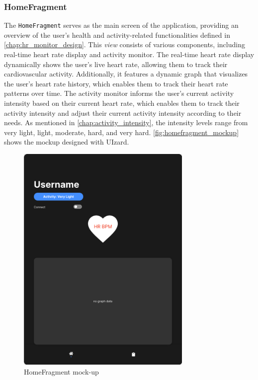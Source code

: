 \subsubsection{HomeFragment}
\label{chap:home_design}
The \texttt{HomeFragment} serves as the main screen of the application, providing an overview of the user's health and activity-related functionalities defined in \autoref{chap:hr_monitor_design}. This \emph{view} consists of various components, including real-time heart rate display and activity monitor.
The real-time heart rate display dynamically shows the user's live heart rate, allowing them to track their cardiovascular activity. Additionally, it features a dynamic graph that visualizes the user's heart rate history, which enables them to track their heart rate patterns over time.
The activity monitor informs the user's current activity intensity based on their current heart rate, which enables them to track their activity intensity and adjust their current activity intensity according to their needs. As mentioned in \autoref{chap:activity_intensity}, the intensity levels range from very light, light, moderate, hard, and very hard.
\autoref{fig:homefragment_mockup} shows the mockup designed with UIzard.
\begin{figure}[H]
    \centering
    \includegraphics[width=0.75\textwidth]{images/home-fragment-mockup.png}
    \caption{HomeFragment mock-up}
    \label{fig:homefragment_mockup}
\end{figure}

